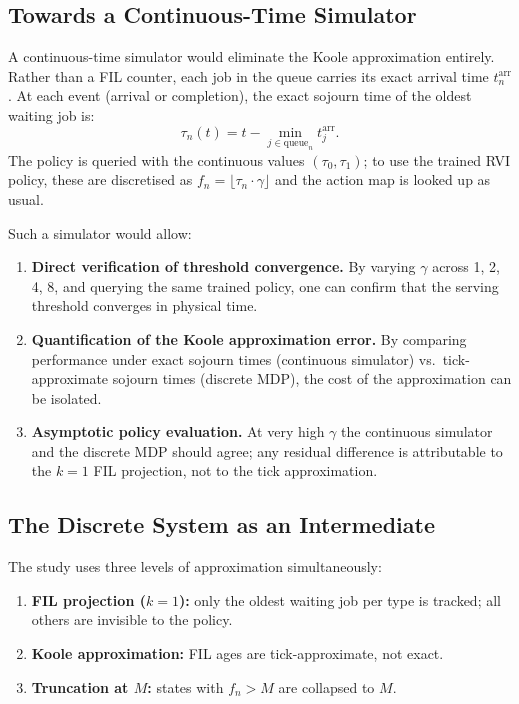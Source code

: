 \documentclass[11pt,a4paper]{article}
\begin{document}
\subsection{Towards a Continuous-Time Simulator}

A continuous-time simulator would eliminate the Koole approximation entirely.
Rather than a FIL counter, each job in the queue carries its exact arrival time
$t_n^\text{arr}$.  At each event (arrival or completion), the exact sojourn
time of the oldest waiting job is:
\[
  \tau_n(t) = t - \min_{j \in \text{queue}_n} t_j^\text{arr}.
\]
The policy is queried with the continuous values $(\tau_0, \tau_1)$; to use the
trained RVI policy, these are discretised as $f_n = \lfloor \tau_n \cdot \gamma
\rfloor$ and the action map is looked up as usual.

Such a simulator would allow:
\begin{enumerate}
  \item \textbf{Direct verification of threshold convergence.}  By varying
        $\gamma$ across 1, 2, 4, 8, and querying the same trained policy, one
        can confirm that the serving threshold converges in physical time.
  \item \textbf{Quantification of the Koole approximation error.}  By comparing
        performance under exact sojourn times (continuous simulator) vs.\
        tick-approximate sojourn times (discrete MDP), the cost of the
        approximation can be isolated.
  \item \textbf{Asymptotic policy evaluation.}  At very high $\gamma$ the
        continuous simulator and the discrete MDP should agree; any residual
        difference is attributable to the $k=1$ FIL projection, not to the
        tick approximation.
\end{enumerate}

\subsection{The Discrete System as an Intermediate}

The study uses three levels of approximation simultaneously:
\begin{enumerate}
  \item \textbf{FIL projection ($k=1$):} only the oldest waiting job per type
        is tracked; all others are invisible to the policy.
  \item \textbf{Koole approximation:} FIL ages are tick-approximate, not exact.
  \item \textbf{Truncation at $M$:} states with $f_n > M$ are collapsed to $M$.
\end{enumerate}
\end{document}
